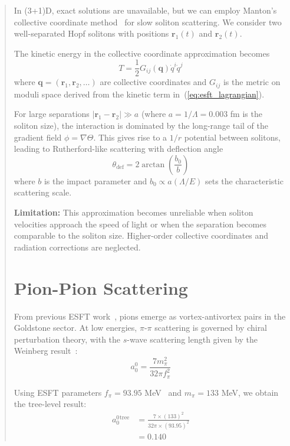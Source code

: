 ﻿\documentclass[twocolumn,prd,amsmath,amssymb,aps]{revtex4-2}
\begin{document}
\begin{abstract}
In (3+1)D, exact solutions are unavailable, but we can employ Manton's collective coordinate method~\cite{Manton1982} for slow soliton scattering. We consider two well-separated Hopf solitons with positions $\mathbf{r}_1(t)$ and $\mathbf{r}_2(t)$.

The kinetic energy in the collective coordinate approximation becomes
\begin{equation}
T = \frac{1}{2}G_{ij}(\mathbf{q})\dot{q}^i\dot{q}^j
\end{equation}
where $\mathbf{q} = (\mathbf{r}_1, \mathbf{r}_2, \ldots)$ are collective coordinates and $G_{ij}$ is the metric on moduli space derived from the kinetic term in~(\ref{eq:esft_lagrangian}).

For large separations $|\mathbf{r}_1 - \mathbf{r}_2| \gg a$ (where $a = 1/\Lambda = 0.003$ fm is the soliton size), the interaction is dominated by the long-range tail of the gradient field $\phi = \nabla\Theta$. This gives rise to a $1/r$ potential between solitons, leading to Rutherford-like scattering with deflection angle
\begin{equation}
\theta_{\text{def}} = 2\arctan\left(\frac{b_0}{b}\right)
\end{equation}
where $b$ is the impact parameter and $b_0 \propto a(\Lambda/E)$ sets the characteristic scattering scale.

\textbf{Limitation:} This approximation becomes unreliable when soliton velocities approach the speed of light or when the separation becomes comparable to the soliton size. Higher-order collective coordinates and radiation corrections are neglected.

\section{Pion-Pion Scattering}

From previous ESFT work~\cite{ESFT5}, pions emerge as vortex-antivortex pairs in the Goldstone sector. At low energies, $\pi$-$\pi$ scattering is governed by chiral perturbation theory, with the $s$-wave scattering length given by the Weinberg result~\cite{Weinberg1966}:
\begin{equation}
a_0^0 = \frac{7m_\pi^2}{32\pi f_\pi^2}
\label{eq:weinberg_length}
\end{equation}

Using ESFT parameters $f_\pi = 93.95$ MeV~\cite{ESFT8} and $m_\pi = 133$ MeV, we obtain the tree-level result:
\begin{align}
a_0^0^{\text{tree}} &= \frac{7 \times (133)^2}{32\pi \times (93.95)^2} \nonumber \\
&= 0.140
\label{eq:esft_scattering_length}
\end{align}


\end{abstract}
\end{document}
